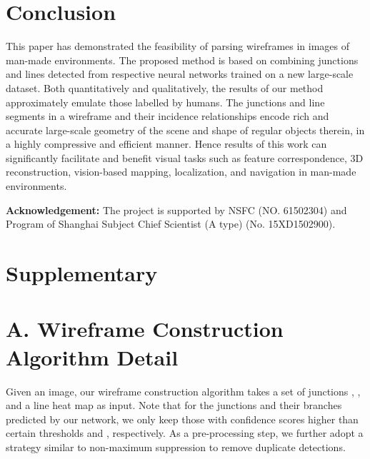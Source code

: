\documentclass[10pt,twocolumn,letterpaper]{article}
\begin{document}
 \section{Conclusion}
This paper has demonstrated the feasibility of parsing wireframes in images of man-made environments. The proposed method is based on combining junctions and lines detected from respective neural networks trained on a new large-scale dataset. Both quantitatively and qualitatively, the results of our method approximately emulate those labelled by humans. The junctions and line segments in a wireframe and their incidence relationships encode rich and accurate large-scale geometry of the scene and shape of regular objects therein, in a highly compressive and efficient manner. Hence results of this work can significantly facilitate and benefit visual tasks such as feature correspondence, 3D reconstruction, vision-based mapping, localization, and navigation in man-made environments. 

\noindent\textbf{Acknowledgement:} The project is supported by NSFC (NO. 61502304) and Program of Shanghai Subject Chief Scientist (A type) (No. 15XD1502900). 
\newpage
{\small


}

\clearpage

\section*{Supplementary}
\section*{A. Wireframe Construction Algorithm Detail}

Given an image, our wireframe construction algorithm takes a set of junctions , , and a line heat map  as input. Note that for the junctions and their branches predicted by our network, we only keep those with confidence scores higher than certain thresholds  and , respectively. As a pre-processing step, we further adopt a strategy similar to non-maximum suppression to remove duplicate detections. 
\end{document}
